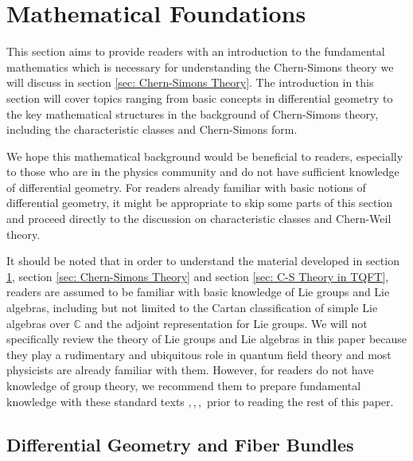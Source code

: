 \section{Mathematical Foundations}\label{sec: Mathematical Foundations}
\par This section aims to provide readers with an introduction to the fundamental mathematics which is necessary for understanding the Chern-Simons theory we will discuss in section \ref{sec: Chern-Simons Theory}. The introduction in this section will cover topics ranging from basic concepts in differential geometry to the key mathematical structures in the background of Chern-Simons theory, including the characteristic classes and Chern-Simons form. 
\par We hope this mathematical background would be beneficial to readers, especially to those who are in the physics community and do not have sufficient knowledge of differential geometry. For readers already familiar with basic notions of differential geometry, it might be appropriate to skip some parts of this section and proceed directly to the discussion on characteristic classes and Chern-Weil theory. 
\par It should be noted that in order to understand the material developed in section \ref{sec: Mathematical Foundations}, section \ref{sec: Chern-Simons Theory} and section \ref{sec: C-S Theory in TQFT}, readers are assumed to be familiar with basic knowledge of Lie groups and Lie algebras, including but not limited to the Cartan classification of simple Lie algebras over $\mathbb{C}$ and the adjoint representation for Lie groups. We will not specifically review the theory of Lie groups and Lie algebras in this paper because they play a rudimentary and ubiquitous role in quantum field theory and most physicists are already familiar with them. However, for readers do not have knowledge of group theory, we recommend them to prepare fundamental knowledge with these standard texts \cite{Hall2015},\,\cite{Knapp2002},\,\cite{FultonHarris1991},\,\cite{Humphreys1972} prior to reading the rest of this paper.  
\subsection{Differential Geometry and Fiber Bundles}\label{subsec: Differential Geometry and Fiber Bundles} %
